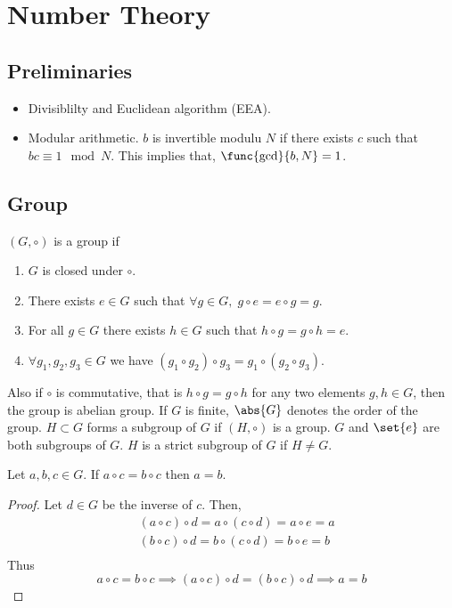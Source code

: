 \chapter{Number Theory}
\section{Preliminaries}
\begin{itemize}
    \item Divisiblilty and Euclidean algorithm (EEA).
    \item Modular arithmetic. \(b\) is invertible modulu \(N\) if there exists \(c\) such that \(bc \equiv 1 \mod N\). This implies that, \(\func{\gcd}{b,N} = 1\).
\end{itemize} 
\section{Group}
\((G,\circ)\) is a group if 
\begin{enumerate}
    \item \(G\) is closed under \(\circ\).
    \item There exists \(e \in G\) such that \(\forall g \in G,\; g \circ e = e \circ g = g\).
    \item For all \(g \in G\) there exists \(h \in G\) such that \(h \circ g = g \circ h = e\).
    \item \(\forall g_1,g_2,g_3 \in G\) we have \((g_1 \circ g_2) \circ g_3 = g_1 \circ (g_2 \circ g_3)\). 
\end{enumerate}
Also if \(\circ\) is commutative, that is \(h \circ g = g \circ h\) for any two elements \(g,h \in G\), then the group is abelian group. If \(G\) is finite, \(\abs{G}\) denotes the order of the group. \(H \subset G\) forms a subgroup of \(G\) if \((H,\circ)\) is a group. \(G\) and \(\set{e}\) are both subgroups of \(G\). \(H\) is a strict subgroup of \(G\) if \(H \neq G\). 
\begin{lemma} \label{lm:subtraction}
    Let \(a,b,c \in G\). If \(a \circ c = b \circ c\) then \(a = b\).
\end{lemma}
\begin{proof}
    Let \(d \in G\) be the inverse of \(c\). Then, 
    \begin{align*}
        &(a \circ c) \circ d = a \circ (c \circ d) = a \circ e = a\\
        &(b \circ c) \circ d = b \circ (c \circ d) = b \circ e = b\\
    \end{align*}
    Thus 
    \begin{equation*}
        a \circ c = b \circ c \implies (a \circ c) \circ d = (b \circ c) \circ d \implies a = b
    \end{equation*}
\end{proof}

